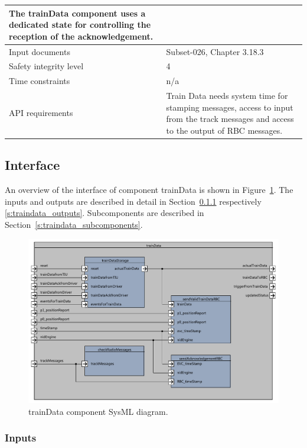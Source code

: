 \begin{longtable}{p{}p{}}
The trainData component uses a dedicated state for controlling the reception of the acknowledgement.\\
\midrule
Input documents	& Subset-026, Chapter 3.18.3\\
\midrule
Safety integrity level	& 4 \\
\midrule
Time constraints		& n/a \\
\midrule
API requirements 		& Train Data needs system time for stamping messages, access to input from the track messages and access to the output of RBC messages.\\
\bottomrule
\end{longtable}


\subsection{Interface}

An overview of the interface of component trainData is shown in Figure~\ref{f:traindata_interface}. The inputs and outputs are described in detail in Section~\ref{s:traindata_inputs} respectively \ref{s:traindata_outputs}. Subcomponents are described in Section~\ref{s:traindata_subcomponents}.

\begin{figure}[H]
\center
\includegraphics[width=\textwidth]{./images/F2_3_trainData_SysML.pdf}
\caption{trainData component SysML diagram.}\label{f:traindata_interface}
\end{figure}


\subsubsection{Inputs}\label{s:traindata_inputs}

